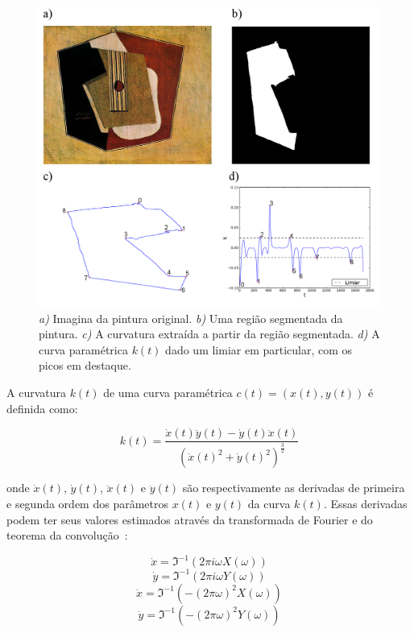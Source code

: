 \begin{figure}[h!]
\begin{center}
      \caption{\textit{a)} Imagina da pintura original. \textit{b)} Uma região
        segmentada da pintura. \textit{c)} A curvatura extraída a partir
        da região segmentada. \textit{d)} A curva paramétrica $k(t)$ dado um
        limiar em particular, com os picos em destaque.}
        \label{fig:curvatura}
        \includegraphics[width=\columnwidth]{figs/curvatura}
       \fonteminha
\end{center}
\end{figure}

A curvatura $k(t)$ de uma curva paramétrica $c(t) = (x(t), y(t))$ é definida como:

\begin{equation}
k(t) = \frac{\dot{x}(t)\ddot{y}(t)-\dot{y}(t)\ddot{x}(t)} {(\dot{x}(t)^2+\dot{y}(t)^2)^\frac{3}{2}}
\label{eq:curvatura}
\end{equation}

\noindent onde $\dot{x}(t)$, $\dot{y}(t)$, $\ddot{x}(t)$ e
$\ddot{y}(t)$ são respectivamente as derivadas de primeira e segunda
ordem dos parâmetros $x(t)$ e $y(t)$ da curva $k(t)$. Essas derivadas
podem ter seus valores estimados através da transformada de Fourier e
do teorema da convolução~\cite{papoulis}:

\begin{equation}
\dot{x} = \Im^{-1}(2\pi i \omega X(\omega))
\end{equation}
\begin{equation}
\dot{y} = \Im^{-1}(2\pi i \omega Y(\omega))
\end{equation}
\begin{equation}
\ddot{x} = \Im^{-1}(-(2\pi\omega)^2 X(\omega))
\end{equation}
\begin{equation}
\ddot{y} = \Im^{-1}(-(2\pi\omega)^2 Y(\omega))
\end{equation}

